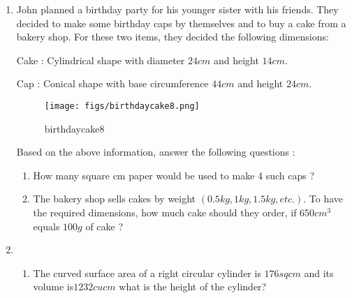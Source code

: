 \documentclass{article}
\begin{document}
\begin{enumerate}
\item John planned a birthday party for his younger sister with his friends. They decided to make some birthday caps by themselves and to buy a cake from a bakery shop. For these two items, they decided the following dimensions:

Cake : Cylindrical shape with diameter $24 cm$ and height $14 cm.$

Cap : Conical shape with base circumference $44 cm$ and height $24 cm.$
\begin{figure}[H]
    \centering
    \texttt{[image: figs/birthdaycake8.png]}
    \caption{birthdaycake8}
    \label{fig:birthdaycake8}
\end{figure}
Based on the above information, answer the following questions :
\begin{enumerate}
    \item How many square cm paper would be used to make 4 such caps ?
    \item The bakery shop sells cakes by weight $(0.5 kg, 1 kg, 1.5 kg, etc.).$ To have the required dimensions, how much cake should they order, if $650 cm^3$ equals $100 g$ of cake ?
\end{enumerate}
\newpage
\item 
\begin{enumerate}
    \item The curved surface area of a right circular cylinder is $176 sq cm$ and its volume is$1232 cu cm$ what is the height of the cylinder?
    

\end{enumerate}
\end{enumerate}
\end{document}
